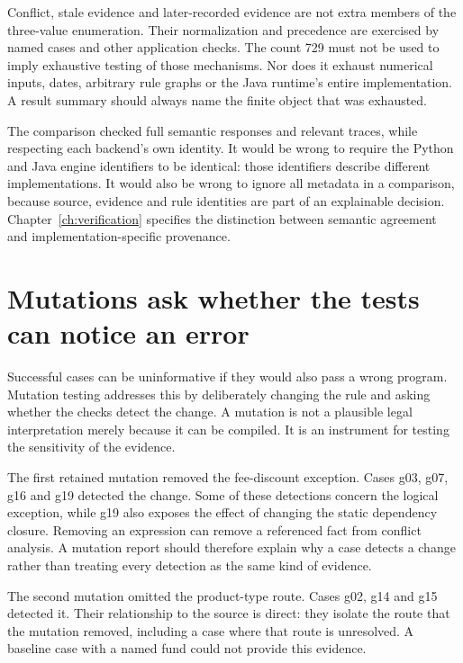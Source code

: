\documentclass[12pt,a4paper,oneside,openany]{book}
\begin{document}
Conflict, stale evidence and later-recorded evidence are not extra members of
the three-value enumeration. Their normalization and precedence are exercised
by named cases and other application checks. The count 729 must not be used to
imply exhaustive testing of those mechanisms. Nor does it exhaust numerical
inputs, dates, arbitrary rule graphs or the Java runtime's entire implementation.
A result summary should always name the finite object that was exhausted.

The comparison checked full semantic responses and relevant traces, while
respecting each backend's own identity. It would be wrong to require the Python
and Java engine identifiers to be identical: those identifiers describe
different implementations. It would also be wrong to ignore all metadata in a
comparison, because source, evidence and rule identities are part of an
explainable decision. Chapter~\ref{ch:verification} specifies the distinction
between semantic agreement and implementation-specific provenance.

\section{Mutations ask whether the tests can notice an error}
\label{merge:M02:05}

\label{sec:circular-mutations}
Successful cases can be uninformative if they would also pass a wrong program.
Mutation testing addresses this by deliberately changing the rule and asking
whether the checks detect the change. A mutation is not a plausible legal
interpretation merely because it can be compiled. It is an instrument for
testing the sensitivity of the evidence.

The first retained mutation removed the fee-discount exception. Cases g03, g07,
g16 and g19 detected the change. Some of these detections concern the logical
exception, while g19 also exposes the effect of changing the static dependency
closure. Removing an expression can remove a referenced fact from conflict
analysis. A mutation report should therefore explain why a case detects a
change rather than treating every detection as the same kind of evidence.

The second mutation omitted the product-type route. Cases g02, g14 and g15
detected it. Their relationship to the source is direct: they isolate the
route that the mutation removed, including a case where that route is
unresolved. A baseline case with a named fund could not provide this evidence.
\end{document}
